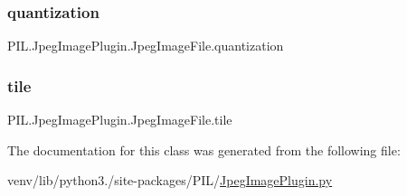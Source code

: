 \subsubsection{\texorpdfstring{quantization}{quantization}}
{\footnotesize\ttfamily P\+I\+L.\+Jpeg\+Image\+Plugin.\+Jpeg\+Image\+File.\+quantization}

\mbox{\label{classPIL_1_1JpegImagePlugin_1_1JpegImageFile_ac16b353bf51d93072c0857c32733b0ad}} 
\subsubsection{\texorpdfstring{tile}{tile}}
{\footnotesize\ttfamily P\+I\+L.\+Jpeg\+Image\+Plugin.\+Jpeg\+Image\+File.\+tile}



The documentation for this class was generated from the following file\+:\begin{DoxyCompactItemize}
\item 
venv/lib/python3./site-\/packages/\+P\+I\+L/\hyperlink{JpegImagePlugin_8py}{Jpeg\+Image\+Plugin.\+py}\end{DoxyCompactItemize}
